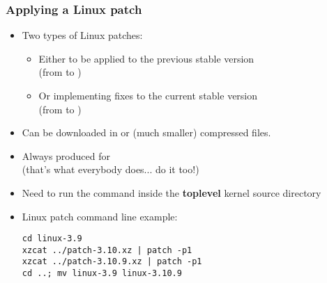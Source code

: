 \begin{frame}[fragile]
  \frametitle{Applying a Linux patch}
  \begin{itemize}
  \item Two types of Linux patches:
        \begin{itemize}
	\item Either to be applied to the previous stable version\\
	      (from  to )
	\item Or implementing fixes to the current stable version\\
	      (from  to )
	\end{itemize}
  \item Can be downloaded in  or  (much
    smaller) compressed files.
  \item Always produced for \\
    (that's what everybody does... do it too!)
  \item Need to run the  command inside the {\bf toplevel}
    kernel source directory
  \item Linux patch command line example:\\
\begin{verbatim}
cd linux-3.9
xzcat ../patch-3.10.xz | patch -p1
xzcat ../patch-3.10.9.xz | patch -p1
cd ..; mv linux-3.9 linux-3.10.9
\end{verbatim}
  \end{itemize}
\end{frame}
